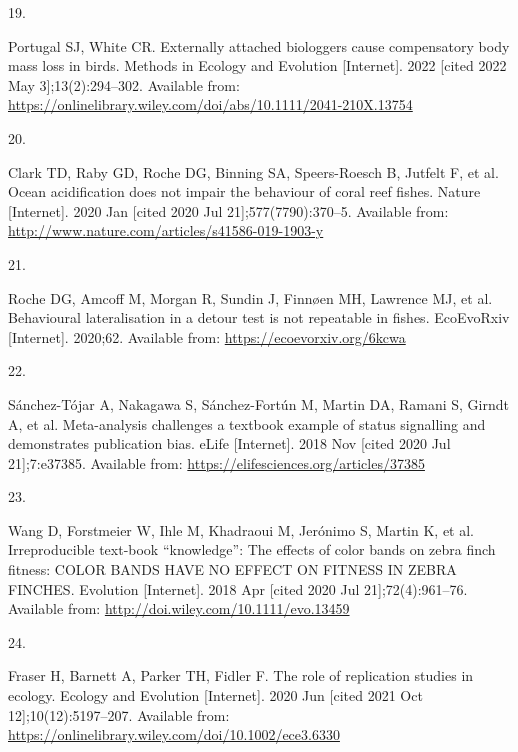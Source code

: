 \documentclass[10pt,a4paper]{article}
\newlength{\cslhangindent}
\newlength{\csllabelwidth}
\newlength{\cslentryspacingunit} %
\newenvironment{CSLReferences}[2] %
 {%
  \setlength{\parindent}{0pt}
  \ifodd #1
  \let\oldpar\par
  \def\par{\hangindent=\cslhangindent\oldpar}
  \fi
  \setlength{\parskip}{#2\cslentryspacingunit}
 }%
 {}
\newcommand{\CSLLeftMargin}[1]{\parbox[t]{\csllabelwidth}{#1}}
\newcommand{\CSLRightInline}[1]{\parbox[t]{\linewidth - \csllabelwidth}{#1}\break}
\begin{document}
\begin{CSLReferences}{0}{0}
\leavevmode{}%
\CSLLeftMargin{19. }
\CSLRightInline{Portugal SJ, White CR. Externally attached biologgers cause compensatory body mass loss in birds. Methods in Ecology and Evolution {[}Internet{]}. 2022 {[}cited 2022 May 3{]};13(2):294--302. Available from: \url{https://onlinelibrary.wiley.com/doi/abs/10.1111/2041-210X.13754}}

\leavevmode{}%
\CSLLeftMargin{20. }
\CSLRightInline{Clark TD, Raby GD, Roche DG, Binning SA, Speers-Roesch B, Jutfelt F, et al. Ocean acidification does not impair the behaviour of coral reef fishes. Nature {[}Internet{]}. 2020 Jan {[}cited 2020 Jul 21{]};577(7790):370--5. Available from: \url{http://www.nature.com/articles/s41586-019-1903-y}}

\leavevmode{}%
\CSLLeftMargin{21. }
\CSLRightInline{Roche DG, Amcoff M, Morgan R, Sundin J, Finnøen MH, Lawrence MJ, et al. Behavioural lateralisation in a detour test is not repeatable in fishes. EcoEvoRxiv {[}Internet{]}. 2020;62. Available from: \url{https://ecoevorxiv.org/6kcwa}}

\leavevmode{}%
\CSLLeftMargin{22. }
\CSLRightInline{Sánchez-Tójar A, Nakagawa S, Sánchez-Fortún M, Martin DA, Ramani S, Girndt A, et al. Meta-analysis challenges a textbook example of status signalling and demonstrates publication bias. eLife {[}Internet{]}. 2018 Nov {[}cited 2020 Jul 21{]};7:e37385. Available from: \url{https://elifesciences.org/articles/37385}}

\leavevmode{}%
\CSLLeftMargin{23. }
\CSLRightInline{Wang D, Forstmeier W, Ihle M, Khadraoui M, Jerónimo S, Martin K, et al. Irreproducible text-book {``knowledge''}: {The} effects of color bands on zebra finch fitness: {COLOR} {BANDS} {HAVE} {NO} {EFFECT} {ON} {FITNESS} {IN} {ZEBRA} {FINCHES}. Evolution {[}Internet{]}. 2018 Apr {[}cited 2020 Jul 21{]};72(4):961--76. Available from: \url{http://doi.wiley.com/10.1111/evo.13459}}

\leavevmode{}%
\CSLLeftMargin{24. }
\CSLRightInline{Fraser H, Barnett A, Parker TH, Fidler F. The role of replication studies in ecology. Ecology and Evolution {[}Internet{]}. 2020 Jun {[}cited 2021 Oct 12{]};10(12):5197--207. Available from: \url{https://onlinelibrary.wiley.com/doi/10.1002/ece3.6330}}


\end{CSLReferences}
\end{document}

